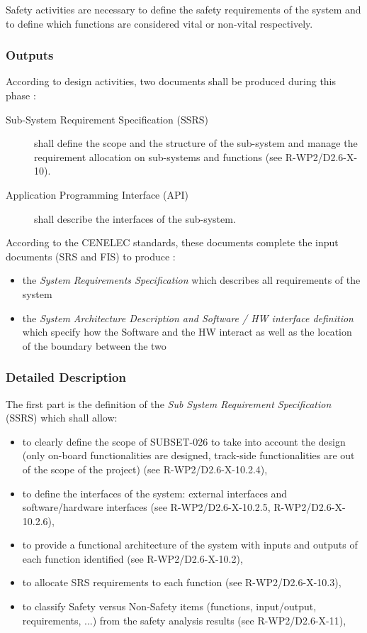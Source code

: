 Safety activities are necessary to define the safety requirements of the system and to define which functions are considered vital or non-vital respectively.

\subsubsection{Outputs}
\label{sec:sys-ana-outputs}

According to  design activities, two documents shall be produced during this phase :

\begin{description}
\item[Sub-System Requirement Specification (SSRS)] shall define the scope and the structure of the sub-system and  manage the requirement allocation on sub-systems and functions (see R-WP2/D2.6-X-10).
\item[Application Programming Interface (API)] shall describe the interfaces of the sub-system.
\end{description}


According to the CENELEC standards, these documents complete the input documents (SRS and FIS) to produce :
\begin{itemize}
\item the \emph{System  Requirements Specification} which describes all requirements of the system
\item the \emph{System Architecture Description
and Software / HW interface definition } which specify how the Software and the HW interact
as well as the location of the boundary between the two
\end{itemize}

\subsubsection{Detailed Description}
\label{sec:sys-ana-descr}

The first part is the definition of the  \emph{Sub System Requirement Specification} (SSRS) which shall allow:
\begin{itemize}
\item to clearly define the scope of SUBSET-026 to take into account the design (only on-board functionalities are designed, track-side functionalities are out of the scope of the project) (see R-WP2/D2.6-X-10.2.4),
\item to define the interfaces of the system: external interfaces and software/hardware interfaces (see R-WP2/D2.6-X-10.2.5, R-WP2/D2.6-X-10.2.6),
\item to provide a functional architecture of the system with inputs and outputs of each function identified (see R-WP2/D2.6-X-10.2),
\item to allocate SRS requirements to each function (see R-WP2/D2.6-X-10.3),
\item to classify Safety versus Non-Safety items (functions, input/output, requirements, ...) from the safety analysis results (see R-WP2/D2.6-X-11),
\end{itemize}

